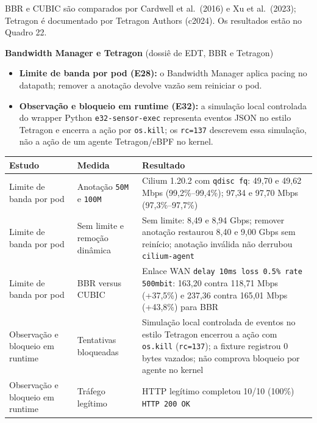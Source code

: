 \documentclass[12pt,openany,oneside,a4paper,chapter=TITLE,english,brazil]{abntex2}
\providecommand{\tightlist}{\setlength{\itemsep}{0pt}\setlength{\parskip}{0pt}}
\begin{document}
BBR e CUBIC são comparados por Cardwell et al.~(2016) e Xu et al.~(2023); Tetragon é documentado por Tetragon Authors (c2024). Os resultados estão no Quadro 22.

\textbf{Bandwidth Manager e Tetragon} (dossiê de EDT, BBR e Tetragon)

\begin{itemize}
\tightlist
\item
  \textbf{Limite de banda por pod (E28):} o Bandwidth Manager aplica pacing no datapath; remover a anotação devolve vazão sem reiniciar o pod.
\item
  \textbf{Observação e bloqueio em runtime (E32):} a simulação local controlada do wrapper Python \texttt{e32-{}\allowbreak{}sensor-{}\allowbreak{}exec} representa eventos JSON no estilo Tetragon e encerra a ação por \texttt{os.\allowbreak{}kill}; os \texttt{rc=\allowbreak{}137} descrevem essa simulação, não a ação de um agente Tetragon/eBPF no kernel.
\end{itemize}

\begin{quadro}[!htbp]
\caption{Resultados de pacing e runtime security}
\footnotesize
\begin{tabularx}{\textwidth}{|>{\raggedright\arraybackslash\hsize=0.715\hsize}X|>{\raggedright\arraybackslash\hsize=0.681\hsize}X|>{\raggedright\arraybackslash\hsize=1.604\hsize}X|}
\hline
\textbf{Estudo} & \textbf{Medida} & \textbf{Resultado} \\
\hline
Limite de banda por pod & Anotação \texttt{50M} e \texttt{100M} & Cilium 1.20.2 com \texttt{qdisc fq}: 49,70 e 49,62 Mbps
(99,2\%--99,4\%); 97,34 e 97,70 Mbps (97,3\%--97,7\%) \\
\hline
Limite de banda por pod & Sem limite e remoção dinâmica & Sem limite: 8,49 e 8,94 Gbps; remover anotação restaurou 8,40 e 9,00
Gbps sem reinício; anotação inválida não derrubou
\texttt{cilium-{}\allowbreak{}agent} \\
\hline
Limite de banda por pod & BBR versus CUBIC & Enlace WAN \texttt{delay 10ms loss 0.\allowbreak{}5\% rate 500mbit}:
163,20 contra 118,71 Mbps (+37,5\%) e 237,36 contra 165,01 Mbps
(+43,8\%) para BBR \\
\hline
Observação e bloqueio em runtime & Tentativas bloqueadas & Simulação local controlada de eventos no estilo Tetragon encerrou a ação
com \texttt{os.\allowbreak{}kill} (\texttt{rc=\allowbreak{}137}); a
fixture registrou 0 bytes vazados; não comprova bloqueio por agente no
kernel \\
\hline
Observação e bloqueio em runtime & Tráfego legítimo & HTTP legítimo completou 10/10 (100\%) \texttt{HTTP 200 OK} \\
\hline
\end{tabularx}
\end{quadro}
\end{document}
